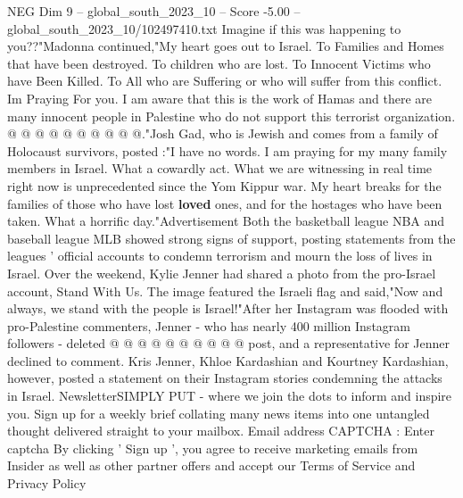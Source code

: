 \begin{textsample}{NEG Dim 9 – global\_south\_2023\_10 – Score -5.00 – global\_south\_2023\_10/102497410.txt}
Imagine if this was happening to you??"Madonna continued,"My heart goes out to Israel.
To Families and Homes that have been destroyed.
To children who are lost.
To Innocent Victims who have Been Killed.
To All who are Suffering or who will suffer from this conflict.
Im Praying For you.
I am aware that this is the work of Hamas and there are many innocent people in Palestine who do not support this terrorist organization. @ @ @ @ @ @ @ @ @ @."Josh Gad, who is Jewish and comes from a family of Holocaust survivors, posted :"I have no words.
I am praying for my many family members in Israel.
What a cowardly act.
What we are witnessing in real time right now is unprecedented since the Yom Kippur war.
My heart breaks for the families of those who have lost \textbf{loved} ones, and for the hostages who have been taken.
What a horrific day."Advertisement Both the basketball league NBA and baseball league MLB showed strong signs of support, posting statements from the leagues ' official accounts to condemn terrorism and mourn the loss of lives in Israel.
Over the weekend, Kylie Jenner had shared a photo from the pro-Israel account, Stand With Us.
The image featured the Israeli flag and said,"Now and always, we stand with the people is Israel!"After her Instagram was flooded with pro-Palestine commenters, Jenner - who has nearly 400 million Instagram followers - deleted @ @ @ @ @ @ @ @ @ @ post, and a representative for Jenner declined to comment.
Kris Jenner, Khloe Kardashian and Kourtney Kardashian, however, posted a statement on their Instagram stories condemning the attacks in Israel.
NewsletterSIMPLY PUT - where we join the dots to inform and inspire you.
Sign up for a weekly brief collating many news items into one untangled thought delivered straight to your mailbox.
Email address CAPTCHA : Enter captcha By clicking ' Sign up ', you agree to receive marketing emails from Insider as well as other partner offers and accept our Terms of Service and Privacy Policy

\end{textsample}
